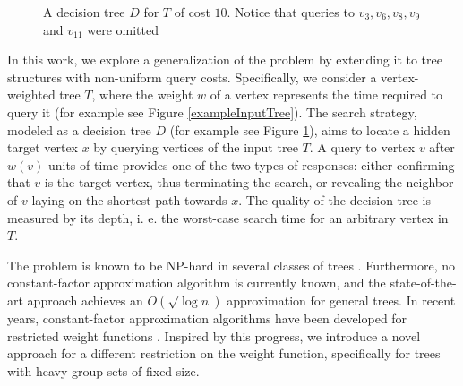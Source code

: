 \documentclass[a4paper, anonymous, numberwithinsect, pdfa, UKenglish,cleveref, autoref, thm-restate]{socg-lipics-v2021}
\newcommand{\br}[1]{\left( #1 \right)}
\begin{document}
\begin{figure}[htbp]
\begin{minipage}[t]{0.47\textwidth}
        \caption{A decision tree $D$ for $T$ of cost $10$. Notice that queries to $v_3, v_6, v_8,v_9$ and $v_{11}$ were omitted}\label{exampleDecisionTree}
    \end{minipage}
\end{figure}
In this work, we explore a generalization of the problem by extending it to tree structures with non-uniform query costs. Specifically, we consider a vertex-weighted tree 
$T$, where the weight $w$ of a vertex represents the time required to query it (for example see Figure \ref{exampleInputTree}). The search strategy, modeled as a decision tree $D$ (for example see Figure \ref{exampleDecisionTree}), aims to locate a hidden target vertex 
$x$ by querying vertices of the input tree 
$T$. A query to vertex 
$v$ after $w\br{v}$ units of time provides one of the two types of responses: either confirming that 
$v$ is the target vertex, thus terminating the search, or revealing the neighbor of $v$ laying on the shortest path towards $x$. The quality of the decision tree is measured by its depth, i. e. the worst-case search time for an arbitrary vertex in $T$. 

The problem is known to be NP-hard in several classes of trees \cite{DereniowskiVxRankOfChGsAndWTs, Dereniowski2009ERankOfWTs,Cicalese2012BinIdentPForWTs,Cicalese2016OnTSPwNonUniCost}. Furthermore, no constant-factor approximation algorithm is currently known, and the state-of-the-art approach achieves an  $O\br{\sqrt{\log n}}$ approximation \cite{dereniowski2017ApproxSsForGeneralBSinWTs} for general trees. In recent years, constant-factor approximation algorithms have been developed for restricted weight functions \cite{dereniowski2022CFApproxAlgForBSInTsWithMonoQTimes, dereniowski2024SInTsMonoQTs}. Inspired by this progress, we introduce a novel approach for a different restriction on the weight function, specifically for trees with heavy group sets of fixed size.
\end{document}
